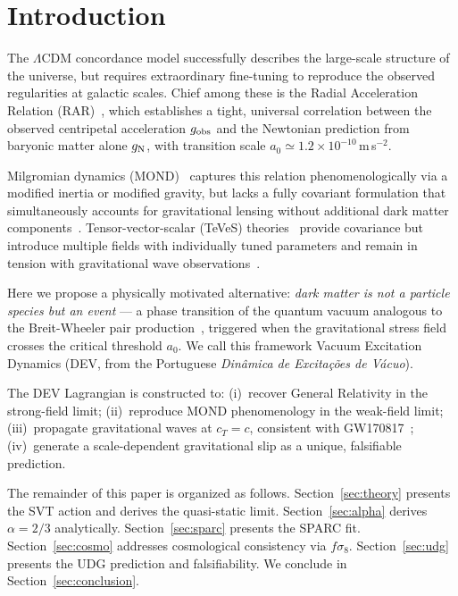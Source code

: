 \documentclass[aps,prd,twocolumn,showpacs,superscriptaddress]{revtex4-2}
\newcommand{\aO}{a_0}
\newcommand{\gN}{g_{\rm N}}
\newcommand{\gobs}{g_{\rm obs}}
\newcommand{\LCDM}{$\Lambda$CDM}
\begin{document}
\maketitle

\section{Introduction}
\label{sec:intro}

The \LCDM{} concordance model successfully describes the large-scale
structure of the universe, but requires extraordinary fine-tuning to
reproduce the observed regularities at galactic scales.
Chief among these is the Radial Acceleration Relation
(RAR)~\cite{McGaugh2016}, which establishes a tight, universal
correlation between the observed centripetal acceleration $\gobs$ and
the Newtonian prediction from baryonic matter alone $\gN$,
with transition scale $\aO \simeq 1.2\times10^{-10}$\,m\,s$^{-2}$.

Milgromian dynamics (MOND)~\cite{Milgrom1983} captures this relation
phenomenologically via a modified inertia or modified gravity, but
lacks a fully covariant formulation that simultaneously accounts for
gravitational lensing without additional dark matter
components~\cite{Clowe2006}.
Tensor-vector-scalar (TeVeS) theories~\cite{Bekenstein2004}
provide covariance but introduce multiple fields with individually
tuned parameters and remain in tension with gravitational wave
observations~\cite{GW170817}.

Here we propose a physically motivated alternative:
\emph{dark matter is not a particle species but an event} —
a phase transition of the quantum vacuum analogous to the
Breit-Wheeler pair production~\cite{BreitWheeler1934},
triggered when the gravitational stress field crosses the
critical threshold $\aO$.
We call this framework Vacuum Excitation Dynamics (DEV,
from the Portuguese \emph{Din\^amica de Excita\c{c}\~oes de V\'acuo}).

The DEV Lagrangian is constructed to:
(i)~recover General Relativity in the strong-field limit;
(ii)~reproduce MOND phenomenology in the weak-field limit;
(iii)~propagate gravitational waves at $c_T = c$, consistent with
     GW170817~\cite{GW170817};
(iv)~generate a scale-dependent gravitational slip as a
     unique, falsifiable prediction.

The remainder of this paper is organized as follows.
Section~\ref{sec:theory} presents the SVT action and derives the
quasi-static limit.
Section~\ref{sec:alpha} derives $\alpha = 2/3$ analytically.
Section~\ref{sec:sparc} presents the SPARC fit.
Section~\ref{sec:cosmo} addresses cosmological consistency via $f\sigma_8$.
Section~\ref{sec:udg} presents the UDG prediction and falsifiability.
We conclude in Section~\ref{sec:conclusion}.
\end{document}
